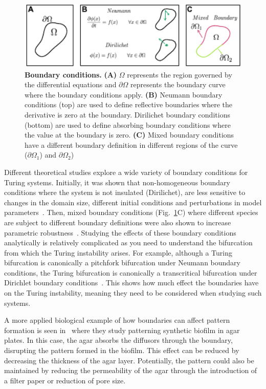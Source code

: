 \begin{figure}[H]
    \centering
    \includegraphics[width=1\textwidth]{chapters/Introduction/boundaries}
    \caption{\textbf{Boundary conditions.} \textbf{(A)} $\Omega$ represents the region governed by the differential equations and $\partial\Omega$ represents the boundary curve where the boundary conditions apply. \textbf{(B)} Neumann boundary conditions (top) are used to define reflective boundaries where the derivative is zero at the boundary. Dirilichet boundary conditions (bottom) are used to define absorbing boundary conditions where the value at the boundary is zero. \textbf{(C)} Mixed boundary conditions have a different boundary definition in different regions of the curve ($\partial\Omega_1$) and $\partial\Omega_2$)  }
    \label{fig:boundaries}
\end{figure}

Different theoretical studies explore a wide variety of boundary conditions for Turing systems.
Initially, it was shown that non-homogeneous boundary conditions where the system is not insulated (Dirilichet), are less sensitive to changes in the domain size, different initial conditions and perturbations in model parameters~\parencite{Arcuri1986}.
Then, mixed boundary conditions (Fig.~\ref{fig:boundaries}C) where different species are subject to different boundary definitions were also shown to increase parametric robustness~\parencite{Maini1993, Maini1997, Krause2021}.
Studying the effects of these boundary conditions analytically is relatively complicated as you need to understand the bifurcation from which the Turing instability arises.
For example, although a Turing bifurcation is canonically a pitchfork bifurcation under Neumann boundary conditions, the Turing bifurcation is canonically a transcritical bifurcation under Dirichlet boundary conditions~\parencite{Woolley2022}. %
This shows how much effect the boundaries have on the Turing instability, meaning they need to be considered when studying such systems.

A more applied biological example of how boundaries can affect pattern formation is seen in~\parencite{Krause2020} where they study patterning synthetic biofilm in agar plates.
In this case, the agar absorbs the diffusors through the boundary, disrupting the pattern formed in the biofilm.
This effect can be reduced by decreasing the thickness of the agar layer.
Potentially, the pattern could also be maintained by reducing the permeability of the agar through the introduction of a filter paper or reduction of pore size.

